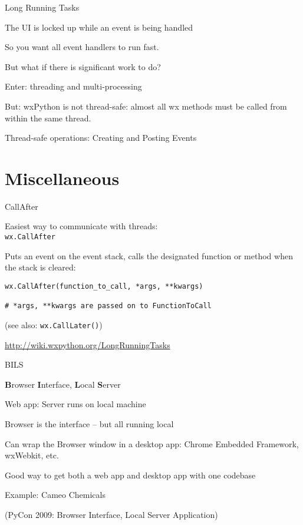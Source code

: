 \documentclass{beamer}
\begin{document}
\begin{frame}[fragile]{Long Running Tasks}

\vfill
{\Large The UI is locked up while an event is being handled}

\vfill
{\Large So you want all event handlers to run fast.}

\vfill
{\Large But what if there is significant work to do?}

\vfill
{\Large Enter: threading and multi-processing}

\vfill
{\Large But: wxPython is not thread-safe: almost all wx methods must be called from within the same thread.}

\vfill
{\Large Thread-safe operations: Creating and Posting Events}


\end{frame}

\section{Miscellaneous}

\begin{frame}[fragile]{CallAfter}

\vfill
{\Large Easiest way to communicate with threads:\\
 \verb`wx.CallAfter`}

\vfill
{\Large Puts an event on the event stack, calls the designated function or method when the stack is cleared:}

\begin{verbatim}
wx.CallAfter(function_to_call, *args, **kwargs)

# *args, **kwargs are passed on to FunctionToCall
\end{verbatim}

{\large (see also: \verb`wx.CallLater()`) }

\vfill
\url{http://wiki.wxpython.org/LongRunningTasks}

\end{frame}




\begin{frame}[fragile]{BILS}

\vfill
{\Large {\bf B}rowser {\bf I}nterface, {\bf L}ocal {\bf S}erver}
\vfill

\vfill
{\Large Web app: Server runs on local machine}
\vfill

\vfill
{\Large Browser is the interface -- but all running local}

\vfill
{\Large Can wrap the Browser window in a desktop app: Chrome Embedded Framework, wxWebkit, etc.}

\vfill
{\Large Good way to get both a web app and desktop app with one codebase}

\vfill
{\Large Example: Cameo Chemicals}

\vfill
(PyCon 2009: Browser Interface, Local Server Application)
\end{frame}
\end{document}
